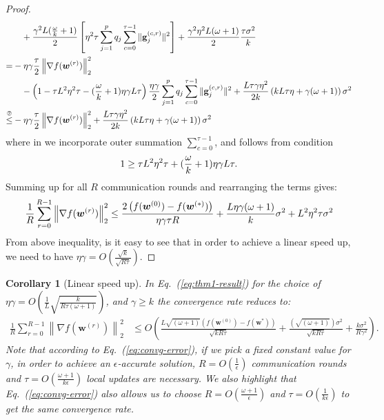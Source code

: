 \documentclass[twoside]{article}
\newtheorem{corollary}{Corollary}
\begin{document}
\begin{proof}
\begin{align}
     &\quad+\frac{\gamma^2 L(\frac{\omega}{k}+1)}{2}\left[{\eta^2\tau}\sum_{j=1}^pq_j\sum_{c=0}^{\tau-1}\|\mathbf{g}^{(c,r)}_{j}\|^2\right]+\frac{\gamma^2\eta^2 L(\omega+1)}{2}\frac{\tau \sigma^2}{k}\nonumber\\
     =&-\eta\gamma\frac{\tau}{2}\left\|\nabla f({\boldsymbol{w}}^{(r)})\right\|_2^2\nonumber\\
     &\quad-\left(1-{\tau L^2\eta^2\tau}-{(\frac{\omega}{k}+1)\eta\gamma L}{\tau}\right)\frac{\eta\gamma}{2}\sum_{j=1}^pq_j\sum_{c=0}^{\tau-1}\|\mathbf{g}^{(c,r)}_{j}\|^2+\frac{L\tau\gamma\eta^2 }{2k}\left(kL\tau\eta+\gamma(\omega+1)\right)\sigma^2\nonumber\\
     \stackrel{\text{\ding{193}}}{\leq}& -\eta\gamma\frac{\tau}{2}\left\|\nabla f({\boldsymbol{w}}^{(r)})\right\|_2^2+\frac{L\tau\gamma\eta^2 }{2k}\left(kL\tau\eta+\gamma(\omega+1)\right)\sigma^2\label{eq:finalll}
\end{align}
where in  we incorporate outer summation $\sum_{c=0}^{\tau-1}$, and   follows from condition 
\begin{align}\notag
   1\geq {\tau L^2\eta^2\tau}+(\frac{\omega}{k}+1)\eta\gamma L{\tau}. 
\end{align}
Summing up for all $R$ communication rounds and  rearranging the terms gives:
\begin{align}\notag
    \frac{1}{R}\sum_{r=0}^{R-1}\left\|\nabla f({\boldsymbol{w}}^{(r)})\right\|_2^2\leq \frac{2\left(f(\boldsymbol{w}^{(0)})-f(\boldsymbol{w}^{(*)})\right)}{\eta\gamma\tau R}+\frac{L\eta\gamma{(\omega+1)}}{k}\sigma^2+{L^2\eta^2\tau }\sigma^2
\end{align}
From above inequality, is it easy to see that in order to achieve a linear speed up, we need to have $\eta\gamma=O\left(\frac{\sqrt{k}}{\sqrt{R \tau}}\right)$.
\end{proof}


\begin{corollary}[Linear speed up] 
In Eq.~(\ref{eq:thm1-result}) for the choice of  $\eta\gamma=O\left(\frac{1}{L}\sqrt{\frac{k}{R\tau\left(\omega+1\right)}}\right)$, and $\gamma\geq k$  the  convergence rate reduces to:
\begin{align}
    \frac{1}{R}\sum_{r=0}^{R-1}\left\|\nabla f({\boldsymbol{w}}^{(r)})\right\|_2^2&\leq O\left(\frac{L\sqrt{\left(\omega+1\right)}\left(f(\boldsymbol{w}^{(0)})-f(\boldsymbol{w}^{*})\right)}{\sqrt{kR\tau}}+\frac{\left(\sqrt{\left(\omega+1\right)}\right)\sigma^2}{\sqrt{kR\tau}}+\frac{k\sigma^2}{R\gamma^2}\right).\label{eq:convg-error}
\end{align}
Note that according to Eq.~(\ref{eq:convg-error}), if we pick  a fixed constant value for  $\gamma$, in order to achieve an $\epsilon$-accurate solution, $R=O\left(\frac{1}{\epsilon}\right)$ communication rounds and $\tau=O\left(\frac{\omega+1}{k\epsilon}\right)$ local updates are necessary. We also highlight  that Eq.~(\ref{eq:convg-error}) also allows us to choose $R=O\left(\frac{\omega+1}{\epsilon}\right)$ and $\tau=O\left(\frac{1}{k\epsilon}\right)$ to get the  same convergence rate.
\end{corollary}
\end{document}
